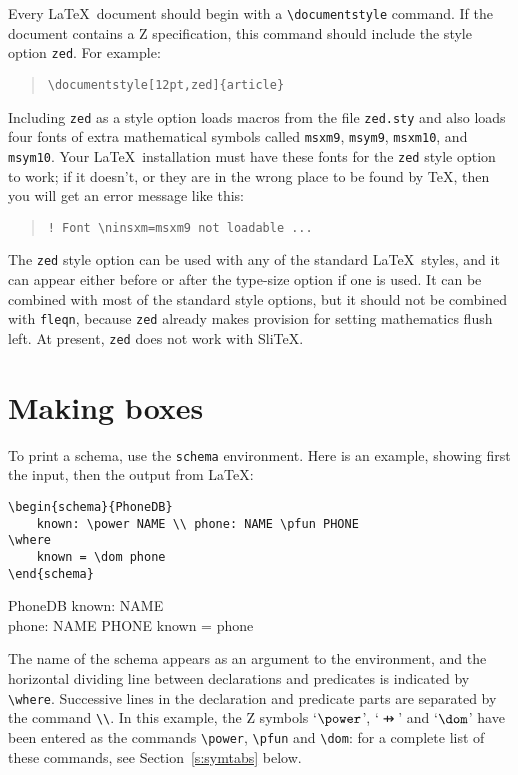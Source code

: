 \documentclass{article}
\def\gives{\endquote\endgroup\egroup}
\begin{document}
Every \LaTeX\ document should begin with a \verb/\documentstyle/
command. If the document contains a Z specification, this command
should include the style option \verb/zed/.  For example:
\begin{quote}
	\verb/\documentstyle[12pt,zed]{article}/
\end{quote}
Including \verb/zed/ as a style option loads macros from the file
\verb/zed.sty/ and also loads four fonts of extra mathematical symbols
called \verb/msxm9/, \verb/msym9/, \verb/msxm10/, and \verb/msym10/.
Your \LaTeX\ installation must have these fonts for the \verb/zed/
style option to work; if it doesn't, or they are in the wrong place to
be found by \TeX, then you will get an error message like this:
\begin{quote}
	\verb/! Font \ninsxm=msxm9 not loadable .../
\end{quote}
The \verb/zed/ style option can be used with any of the standard
\LaTeX\ styles, and it can appear either before or after the type-size
option if one is used. It can be combined with most of the standard
style options, but it should not be combined with \verb/fleqn/,
because {\tt zed} already makes provision for setting mathematics
flush left. At present, \verb/zed/ does not work with Sli\TeX.

\section{Making boxes}

To print a schema, use the \verb/schema/ environment. Here is an
example, showing first the input, then the output from \LaTeX:
\begin{demo}
\begin{verbatim}
\begin{schema}{PhoneDB}
    known: \power NAME \\ phone: NAME \pfun PHONE
\where
    known = \dom phone
\end{schema}
\end{verbatim}
\gives
\begin{schema}{PhoneDB}
    known: \power NAME \\ phone: NAME \pfun PHONE
\where
    known = \dom phone
\end{schema}
\end{demo}
The name of the schema appears as an argument to the environment, and
the horizontal dividing line between declarations and predicates is
indicated by \verb/\where/. Successive lines in the declaration and
predicate parts are separated by the command \verb/\\/. In this
example, the Z symbols `$\power$', `$\pfun$' and `$\dom$' have been
entered as the commands \verb/\power/, \verb/\pfun/ and \verb/\dom/:
for a complete list of these commands, see Section~\ref{s:symtabs}
below.
\end{document}
